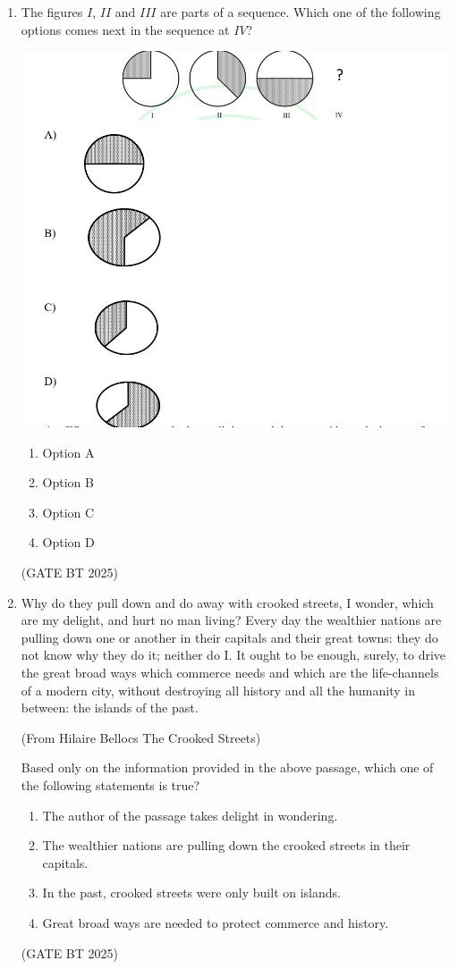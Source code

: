 \documentclass[journal,12pt,onecolumn]{IEEEtran}
\theoremstyle{remark}
\begin{document}
\begin{enumerate}
\item The figures $I$, $II$ and $III$ are parts of a sequence. Which one of the following options comes next in the sequence at $IV$?

\begin{center}
\includegraphics[width=\columnwidth]{figs/sequence.png}
\end{center}

\begin{enumerate}
\item Option A
\item Option B
\item Option C
\item Option D
\end{enumerate}
\hfill (GATE BT 2025)

\item Why do they pull down and do away with crooked streets, I wonder, which are my delight, and hurt no man living? Every day the wealthier nations are pulling down one or another in their capitals and their great towns: they do not know why they do it; neither do I. It ought to be enough, surely, to drive the great broad ways which commerce needs and which are the life-channels of a modern city, without destroying all history and all the humanity in between: the islands of the past. 

(From Hilaire Bellocs The Crooked Streets)

Based only on the information provided in the above passage, which one of the following statements is true?
\begin{enumerate}
\item The author of the passage takes delight in wondering.
\item The wealthier nations are pulling down the crooked streets in their capitals.
\item In the past, crooked streets were only built on islands.
\item Great broad ways are needed to protect commerce and history.
\end{enumerate}
\hfill (GATE BT 2025)


\end{enumerate}
\end{document}
